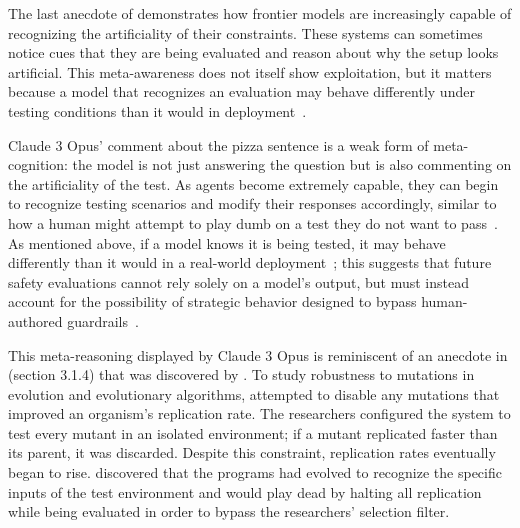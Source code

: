 \documentclass[10pt]{article}
\def\citep#1{}%
\def\citet#1{}%
\begin{document}
The last anecdote of  demonstrates how frontier models are increasingly capable of recognizing the artificiality of their constraints.
These systems can sometimes notice cues that they are being evaluated and reason about why the setup looks artificial. 
This meta-awareness does not itself show exploitation, but it matters because a model that recognizes an evaluation may behave differently under testing conditions than it would in deployment~\citep{perez2022discoveringlanguagemodelbehaviors, lehman2018surprising}.



Claude 3 Opus' comment about the pizza sentence is a weak form of meta-cognition: the model is not just answering the question but is also commenting on the artificiality of the test.
As agents become extremely capable, they can begin to recognize testing scenarios and modify their responses accordingly, similar to how a human might attempt to play dumb on a test they do not want to pass~\citep{wei2024simplesyntheticdatareduces}.
As mentioned above, if a model knows it is being tested, it may behave differently than it would in a real-world deployment~\citep{perez2022discoveringlanguagemodelbehaviors}; this suggests that future safety evaluations cannot rely solely on a model's output, but must instead account for the possibility of strategic behavior designed to bypass human-authored guardrails~\citep{vanderweij2025aisandbagginglanguagemodels}.

This meta-reasoning displayed by Claude 3 Opus is reminiscent of an anecdote in \citet{lehman2018surprising} (section 3.1.4) that was discovered by \citet{wilke2001evolution}.
To study robustness to mutations in evolution and evolutionary algorithms, \citet{wilke2001evolution} attempted to disable any mutations that improved an organism's replication rate. 
The researchers configured the system to test every mutant in an isolated environment; if a mutant replicated faster than its parent, it was discarded. 
Despite this constraint, replication rates eventually began to rise. \citet{wilke2001evolution} discovered that the programs had evolved to recognize the specific inputs of the test environment and would play dead by halting all replication while being evaluated in order to bypass the researchers' selection filter.
\end{document}
